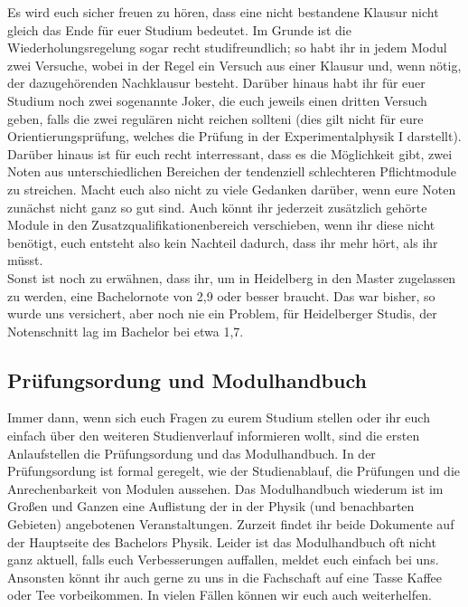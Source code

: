 Es wird euch sicher freuen zu hören, dass eine nicht bestandene Klausur nicht gleich das Ende für euer Studium bedeutet. Im Grunde ist die Wiederholungsregelung sogar recht studifreundlich; so habt ihr in jedem Modul zwei Versuche, wobei in der Regel ein Versuch aus einer Klausur und, wenn nötig, der dazugehörenden Nachklausur besteht. Darüber hinaus habt ihr für euer Studium noch zwei sogenannte Joker, die euch jeweils einen dritten Versuch geben, falls die zwei regulären nicht reichen sollteni (dies gilt nicht für eure Orientierungsprüfung, welches die Prüfung in der Experimentalphysik I darstellt). Darüber hinaus ist für euch recht interressant, dass es die Möglichkeit gibt, zwei Noten aus unterschiedlichen Bereichen der tendenziell schlechteren Pflichtmodule zu streichen. Macht euch also nicht zu viele Gedanken darüber, wenn eure Noten zunächst nicht ganz so gut sind. Auch könnt ihr jederzeit zusätzlich gehörte Module in den Zusatzqualifikationenbereich verschieben, wenn ihr diese nicht benötigt, euch entsteht also kein Nachteil dadurch, dass ihr mehr hört, als ihr müsst.\\

Sonst ist noch zu erwähnen, dass ihr, um in Heidelberg in den Master zugelassen zu werden, eine Bachelornote von 2,9 oder besser braucht. Das war bisher, so wurde uns versichert, aber noch nie ein Problem, für Heidelberger Studis, der Notenschnitt lag im Bachelor bei etwa 1,7.

\subsection{Prüfungsordung und Modulhandbuch}

Immer dann, wenn sich euch Fragen zu eurem Studium stellen oder ihr euch einfach über den weiteren Studienverlauf informieren wollt, sind die ersten Anlaufstellen die Prüfungsordung und das Modulhandbuch. In der Prüfungsordung ist formal geregelt, wie der Studienablauf, die Prüfungen und die Anrechenbarkeit von Modulen aussehen. Das Modulhandbuch wiederum ist im Großen und Ganzen eine Auflistung der in der Physik (und benachbarten Gebieten) angebotenen Veranstaltungen. Zurzeit findet ihr beide Dokumente auf der Hauptseite des Bachelors Physik. Leider ist das Modulhandbuch oft nicht ganz aktuell, falls euch Verbesserungen auffallen, meldet euch einfach bei uns.\\

Ansonsten könnt ihr auch gerne zu uns in die Fachschaft auf eine Tasse Kaffee oder Tee vorbeikommen. In vielen Fällen können wir euch auch weiterhelfen.
